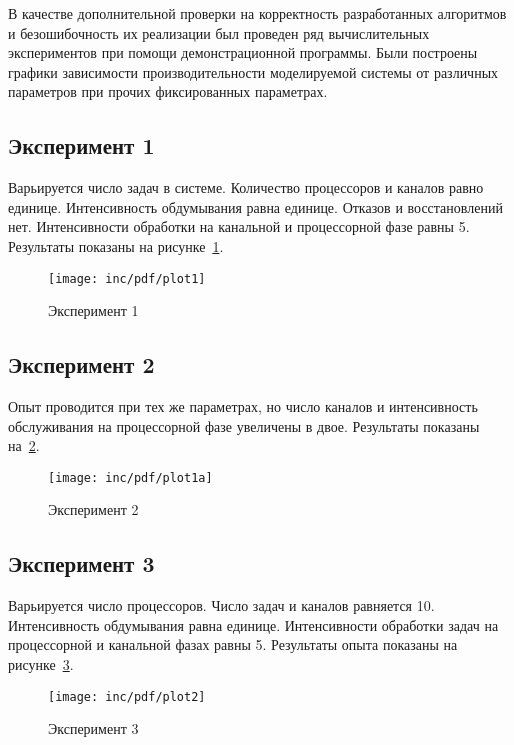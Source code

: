 В качестве дополнительной проверки на корректность разработанных алгоритмов и безошибочность их реализации был проведен ряд вычислительных экспериментов при помощи демонстрационной программы. Были построены графики зависимости производительности моделируемой системы от различных параметров при прочих фиксированных параметрах.

\subsection*{Эксперимент 1}

Варьируется число задач в системе. Количество процессоров и каналов равно единице. Интенсивность обдумывания равна единице. Отказов и восстановлений нет. Интенсивности обработки на канальной и процессорной фазе равны 5. Результаты показаны на рисунке~\ref{fig:plot1}.

\begin{figure}[ht!]
  \centering
  \texttt{[image: inc/pdf/plot1]}
  \caption{Эксперимент 1}
  \label{fig:plot1}
\end{figure}

\subsection*{Эксперимент 2}

Опыт проводится при тех же параметрах, но число каналов и интенсивность обслуживания на процессорной фазе увеличены в двое. Результаты показаны на~\ref{fig:plot1a}.

\begin{figure}[ht!]
  \centering
  \texttt{[image: inc/pdf/plot1a]}
  \caption{Эксперимент 2}
  \label{fig:plot1a}
\end{figure}


\subsection*{Эксперимент 3}

Варьируется число процессоров. Число задач и каналов равняется 10. Интенсивность обдумывания равна единице. Интенсивности обработки задач на процессорной и канальной фазах равны 5. Результаты опыта показаны на рисунке~\ref{fig:plot2}.

\begin{figure}[ht!]
  \centering
  \texttt{[image: inc/pdf/plot2]}
  \caption{Эксперимент 3}
  \label{fig:plot2}
\end{figure}


